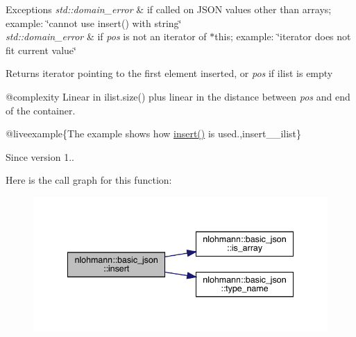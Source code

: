 \begin{DoxyExceptions}{Exceptions}
{\em std\+::domain\+\_\+error} & if called on J\+S\+ON values other than arrays; example\+: {\ttfamily \char`\"{}cannot use insert() with string\char`\"{}} \\
\hline
{\em std\+::domain\+\_\+error} & if {\itshape pos} is not an iterator of $\ast$this; example\+: {\ttfamily \char`\"{}iterator does not fit current value\char`\"{}}\\
\hline
\end{DoxyExceptions}
\begin{DoxyReturn}{Returns}
iterator pointing to the first element inserted, or {\itshape pos} if {\ttfamily ilist} is empty
\end{DoxyReturn}
@complexity Linear in {\ttfamily ilist.\+size()} plus linear in the distance between {\itshape pos} and end of the container.

@liveexample\{The example shows how {\ttfamily \mbox{\hyperlink{classnlohmann_1_1basic__json_a0136728f5db69d4051c77b94307abd6c}{insert()}}} is used.,insert\+\_\+\+\_\+ilist\}

\begin{DoxySince}{Since}
version 1.. 
\end{DoxySince}
Here is the call graph for this function\+:\nopagebreak
\begin{figure}[H]
\begin{center}
\leavevmode
\includegraphics[width=341pt]{classnlohmann_1_1basic__json_ad154c4228e4867c67b25a6601ced89bd_cgraph}
\end{center}
\end{figure}
\mbox{\label{classnlohmann_1_1basic__json_aef9ce5dd2381caee1f8ddcdb5bdd9c65}} 
